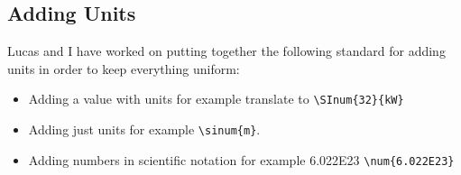 \documentclass[12pt]{article}
\begin{document}
\subsection{Adding Units}
Lucas and I have worked on putting together the following standard for adding units in order to keep
everything uniform:
\begin{itemize}
    \item Adding a value with units for example  translate to
        \verb|\SInum{32}{kW}|
    \item Adding just units for example  \verb|\sinum{m}|.
    \item Adding numbers in scientific notation for example \num{6.022E23}
    \verb|\num{6.022E23}|
\end{itemize}
\end{document}
